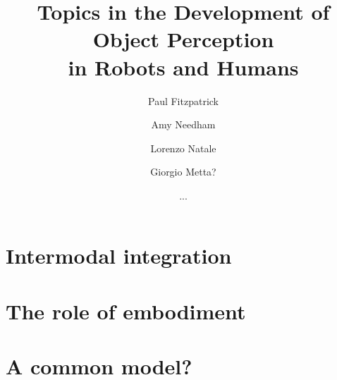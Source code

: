 \documentclass[a4]{epirob}
\title{
Topics in the Development of Object Perception \\ in Robots and Humans
}
\author{Paul Fitzpatrick  \and Amy Needham \and Lorenzo Natale \and
\and Giorgio Metta? \and ...}
\newif\ifcomplete
\begin{document}
\ifcomplete

\maketitle


\begin{abstract}

\end{abstract}


\section{Introduction}




\section{Object segregation}




\fi

\section{Intermodal integration}



\ifcomplete



\section{The role of embodiment}



\section{A common model?}




%
\end{document}
